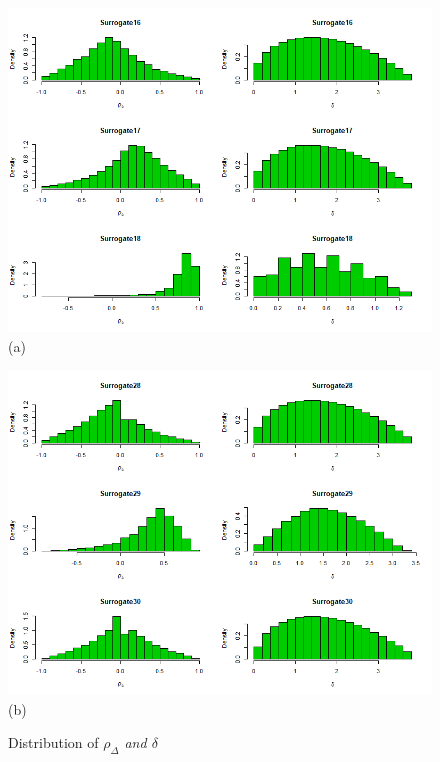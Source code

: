 \documentclass[a4paper,12pt]{article}
\begin{document}
	\begin{figure}[H]
		\centering
		\begin{minipage}{0.45\textwidth}
			\includegraphics[scale=0.35]{icaplots6.png}\\(a)
		\end{minipage} 
		\begin{minipage}{0.45\textwidth}
			\includegraphics[scale=0.35]{icaplots10.png}\\(b)
		\end{minipage} 
		\caption{Distribution of \emph{$\rho_{\Delta}$ and $\delta$}}\label{icaplot2}
	\end{figure}
	
\end{document}
